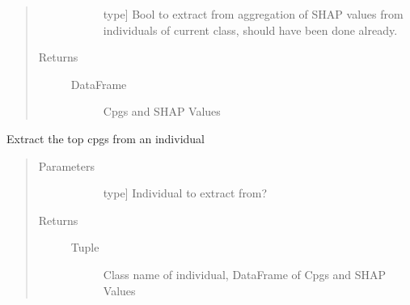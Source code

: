 \documentclass[letterpaper,10pt,english]{sphinxmanual}
\begin{document}
\begin{fulllineitems}
\begin{fulllineitems}
\begin{quote}
\begin{description}
\begin{description}
\item[{}] \leavevmode{[}type{]}
Bool to extract from aggregation of SHAP values from individuals of current class, should have been done already.

\end{description}

\item[{Returns}] \leavevmode\begin{description}
\item[{DataFrame}] \leavevmode
Cpgs and SHAP Values

\end{description}

\end{description}\end{quote}

\end{fulllineitems}


\begin{fulllineitems}
\label{\detokenize{index:methylnet.interpretation_classes.ShapleyDataExplorer.extract_individual}}
Extract the top cpgs from an individual
\begin{quote}\begin{description}
\item[{Parameters}] \leavevmode\begin{description}
\item[{}] \leavevmode{[}type{]}
Individual to extract from?

\end{description}

\item[{Returns}] \leavevmode\begin{description}
\item[{Tuple}] \leavevmode
Class name of individual, DataFrame of Cpgs and SHAP Values

\end{description}

\end{description}\end{quote}


\end{fulllineitems}
\end{fulllineitems}
\end{document}
